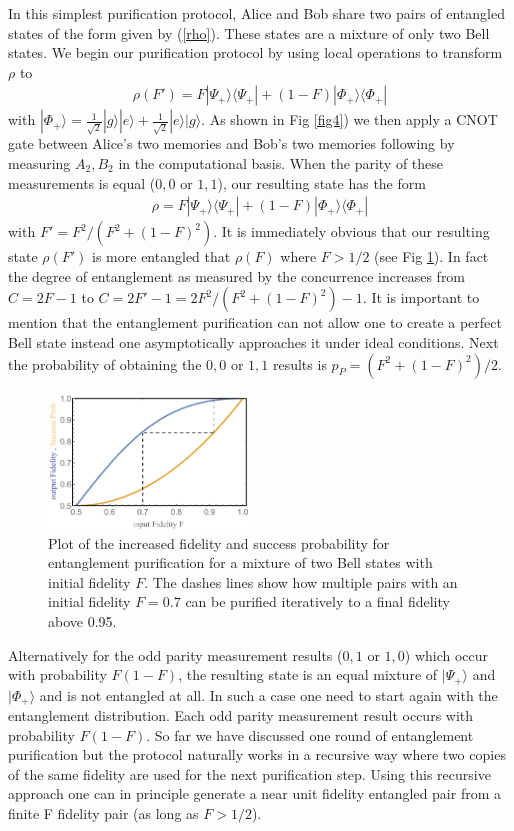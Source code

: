 \documentclass[twocolumn, aps, rmp, amsmath, amssymb, nofootinbib, superscriptaddress, longbibliography, floatfix, table-of-contents, eqsecnum]{revtex4-1}
\begin{document}
In this simplest purification protocol, Alice and Bob share two pairs of entangled states of the form given by (\ref{rho}). These states are a mixture of only two Bell states. We begin our purification protocol by using local operations to transform $\rho$ to  
\begin{align}
\rho(F')=F |\Psi_+\rangle \langle \Psi_+|+(1-F) |\Phi_+\rangle \langle \Phi_+|
\label{rho'}
\end{align}
with $|\Phi_+\rangle=\frac{1}{\sqrt{2}} |g\rangle |e\rangle+ \frac{1}{\sqrt{2}} |e\rangle |g\rangle$. As shown in Fig \ref{fig4}) we then apply a CNOT gate between Alice's two memories and Bob's two memories following by measuring $A_2,B_2$ in the computational basis. When the parity of these measurements is equal ($0,0$ or $1,1$), our resulting state has the form 
\begin{align}
\rho=F |\Psi_+\rangle \langle \Psi_+|+(1-F) |\Phi_+\rangle \langle \Phi_+|
\label{rho2}
\end{align}
with $F'=F^2/(F^2+(1-F)^2)$. It is immediately obvious that our resulting state $\rho(F')$ is more entangled that $\rho(F)$ where $F>1/2$ (see Fig \ref{purification}). In fact the degree of entanglement as measured by the concurrence increases from $C=2 F-1$ to $C=2 F'-1 =  2 F^2/(F^2+(1-F)^2)-1 $. It is important to mention that the entanglement purification can not allow one to create a perfect Bell state instead one asymptotically approaches it under ideal conditions. Next the probability of obtaining the $0,0$ or $1,1$ results is  $p_{P}=(F^2+(1-F)^2)/2$. 
\begin{figure}[!htb]
\begin{center}
\includegraphics[width=0.475\textwidth]{repeaters_5}
\end{center}
\caption{Plot of the increased fidelity and success probability for entanglement purification for a mixture of  two Bell states with initial fidelity $F$. The dashes lines show how multiple pairs with an initial fidelity $F=0.7$ can be purified iteratively to a final fidelity above 0.95.} 
\label{purification}
\end{figure} 
Alternatively for the odd parity measurement results ($0,1$ or $1,0$) which occur with probability $F (1-F)$, the resulting state is an equal mixture of $|\Psi_+\rangle$ and $|\Phi_+\rangle$ and is not entangled at all. In such a case one need to start again with the entanglement distribution.  Each odd parity measurement result occurs with probability $F (1-F)$. So far we have discussed one round of entanglement purification but the protocol naturally works in a recursive way where two copies of the same fidelity are used for the next purification step. Using this recursive approach one can in principle generate a near unit fidelity entangled pair from a finite F fidelity pair (as long as $F>1/2$). 
\end{document}
